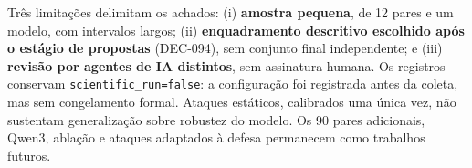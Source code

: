 Três limitações delimitam os achados: (i) \textbf{amostra pequena}, de 12 pares e um modelo, com intervalos largos; (ii) \textbf{enquadramento descritivo escolhido após o estágio de propostas} (DEC-094), sem conjunto final independente; e (iii) \textbf{revisão por agentes de IA distintos}, sem assinatura humana. Os registros conservam \texttt{scientific\_run=false}: a configuração foi registrada antes da coleta, mas sem congelamento formal. Ataques estáticos, calibrados uma única vez, não sustentam generalização sobre robustez do modelo. Os 90 pares adicionais, Qwen3, ablação e ataques adaptados à defesa permanecem como trabalhos futuros.
